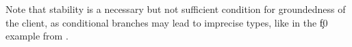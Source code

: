 
Note that stability is a necessary but not sufficient
condition for groundedness of the client,
as conditional branches may lead to imprecise types,
like in the \c{f0} example from .

